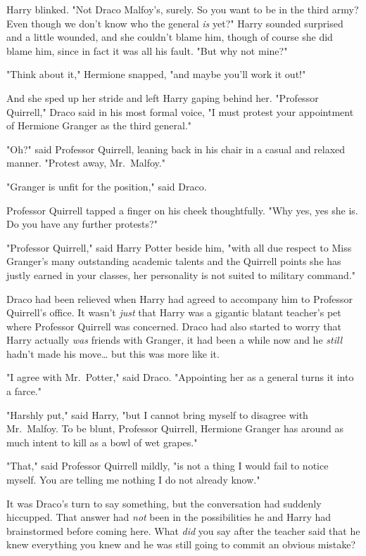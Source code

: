 Harry blinked. "Not Draco Malfoy's, surely. So you want to be in the third 
army? Even though we don't know who the general \emph{is} yet?" Harry sounded 
surprised and a little wounded, and she couldn't blame him, though of course 
she did blame him, since in fact it was all his fault. "But why not mine?"

"Think about it," Hermione snapped, "and maybe you'll work it out!"

And she sped up her stride and left Harry gaping behind her.
\sbreak
"Professor Quirrell," Draco said in his most formal voice, "I must protest your 
appointment of Hermione Granger as the third general."

"Oh?" said Professor Quirrell, leaning back in his chair in a casual and 
relaxed manner. "Protest away, Mr.~Malfoy."

"Granger is unfit for the position," said Draco.

Professor Quirrell tapped a finger on his cheek thoughtfully. "Why yes, yes she 
is. Do you have any further protests?"

"Professor Quirrell," said Harry Potter beside him, "with all due respect to 
Miss Granger's many outstanding academic talents and the Quirrell points she 
has justly earned in your classes, her personality is not suited to military 
command."

Draco had been relieved when Harry had agreed to accompany him to Professor 
Quirrell's office. It wasn't \emph{just} that Harry was a gigantic blatant 
teacher's pet where Professor Quirrell was concerned. Draco had also started to 
worry that Harry actually \emph{was} friends with Granger, it had been a while 
now and he \emph{still} hadn't made his move{\ldots} but this was more like it.

"I agree with Mr.~Potter," said Draco. "Appointing her as a general turns it 
into a farce."

"Harshly put," said Harry, "but I cannot bring myself to disagree with 
Mr.~Malfoy. To be blunt, Professor Quirrell, Hermione Granger has around as 
much intent to kill as a bowl of wet grapes."

"That," said Professor Quirrell mildly, "is not a thing I would fail to notice 
myself. You are telling me nothing I do not already know."

It was Draco's turn to say something, but the conversation had suddenly 
hiccupped. That answer had \emph{not} been in the possibilities he and Harry 
had brainstormed before coming here. What \emph{did} you say after the teacher 
said that he knew everything you knew and he was still going to commit an 
obvious mistake?

